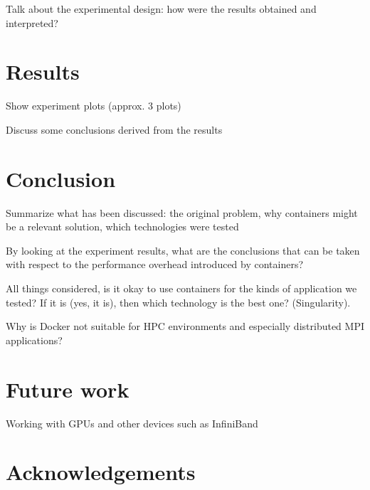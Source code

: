 \documentclass[12pt]{article}
\begin{document}
Talk about the experimental design: how were the results obtained and interpreted?

\section{Results}
Show experiment plots (approx. 3 plots)

Discuss some conclusions derived from the results

\section{Conclusion}
Summarize what has been discussed: the original problem, why containers might be a relevant solution, which technologies were tested

By looking at the experiment results, what are the conclusions that can be taken with respect to the performance overhead introduced by containers?

All things considered, is it okay to use containers for the kinds of application we tested? If it is (yes, it is), then which technology is the best one? (Singularity).

Why is Docker not suitable for HPC environments and especially distributed MPI applications? 

\section{Future work}
Working with GPUs and other devices such as InfiniBand

\section{Acknowledgements}



\end{document}
